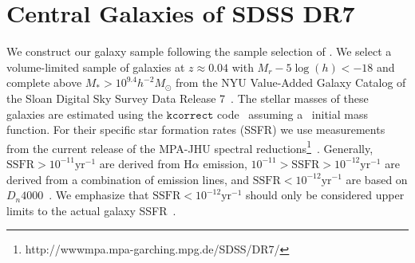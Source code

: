 \documentclass[12pt, letterpaper, preprint, tighten]{aastex62}
\begin{document}
\section{Central Galaxies of SDSS DR7} \label{sec:sdss}
We construct our galaxy sample following the sample selection of \cite{tinker2011}. 
We select a volume-limited sample of galaxies at $z \approx 0.04$ with 
$M_r - 5 \log(h) < -18$ and complete above $M_* > 10^{9.4} h^{-2}M_\odot$ from 
the NYU Value-Added Galaxy Catalog \citep[VAGC;][]{blanton2005} of the 
Sloan Digital Sky Survey Data Release 7~\citep[SDSS DR7;][]{abazajian2009}. 
The stellar masses of these galaxies are estimated using the
$\mathtt{kcorrect}$ code~\citep{blanton2007} assuming a~\cite{chabrier2003} 
initial mass function. For their specific star formation rates (SSFR) we use 
measurements from the current release of the MPA-JHU spectral 
reductions\footnote{http://wwwmpa.mpa-garching.mpg.de/SDSS/DR7/}~\citep{brinchmann2004}.
Generally, $\mathrm{SSFR} > 10^{-11}\mathrm{yr}^{-1}$ are derived from 
$\mathrm{H}\alpha$ emission, $10^{-11} > \mathrm{SSFR} > 10^{-12}\mathrm{yr}^{-1}$
are derived from a combination of emission lines, and $\mathrm{SSFR} < 10^{-12}\mathrm{yr}^{-1}$
are based on $D_n 4000$~\citep[see discussion in][]{wetzel2013}. We emphasize that 
$\mathrm{SSFR} < 10^{-12}\mathrm{yr}^{-1}$ should only be considered upper limits 
to the actual galaxy SSFR~\citep{salim2007}.
\end{document}
